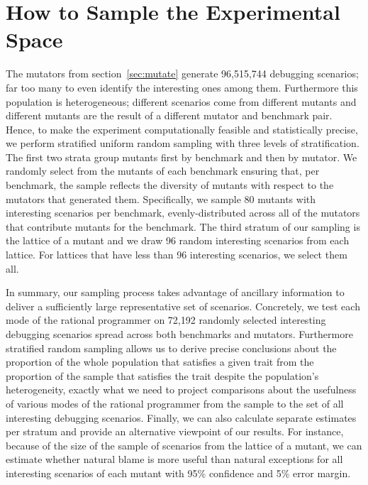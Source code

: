 \section{How to Sample the Experimental Space} 

The mutators from section~\ref{sec:mutate} generate 96,515,744 debugging
scenarios; far too many to even identify the interesting ones among them.
Furthermore this population is heterogeneous; different scenarios come
from different mutants and different mutants are the result of a
different mutator and benchmark pair. Hence, to make the experiment
computationally feasible and statistically precise, we perform stratified
uniform random sampling with three levels of stratification.  The first
two strata group mutants first by benchmark and then by mutator. 
We randomly select from the mutants of
each benchmark ensuring that, per
benchmark, the sample reflects the diversity of mutants with respect to
the mutators that generated them.  Specifically,  we sample 80 mutants
with interesting scenarios per benchmark,  evenly-distributed across all
of the mutators that contribute mutants for the benchmark.  The third
stratum of our sampling is the lattice of a mutant and we draw 96 random
interesting scenarios from each lattice. For lattices that have less than
96 interesting scenarios, we select them all.

In summary, our sampling process takes advantage of ancillary information
to deliver a  sufficiently large representative set of scenarios.
Concretely, we test each
mode of the rational programmer on 72,192 randomly selected interesting
debugging scenarios spread across both benchmarks and mutators.
Furthermore stratified random sampling allows us to derive precise conclusions
about the proportion of the whole population that satisfies a given trait 
from the proportion of the sample 
that satisfies the trait despite the population's heterogeneity, exactly what we need to project comparisons about the
usefulness of various modes of the
rational programmer from the sample to the set of all interesting debugging
scenarios.  Finally, we can also calculate separate estimates per stratum
and provide an alternative
viewpoint of our results. For instance, because of the size of the sample
of scenarios from the lattice of a mutant, we can estimate whether natural
blame is more useful than natural exceptions for all interesting scenarios
of each mutant with 95\% confidence and 5\% error margin.

 



